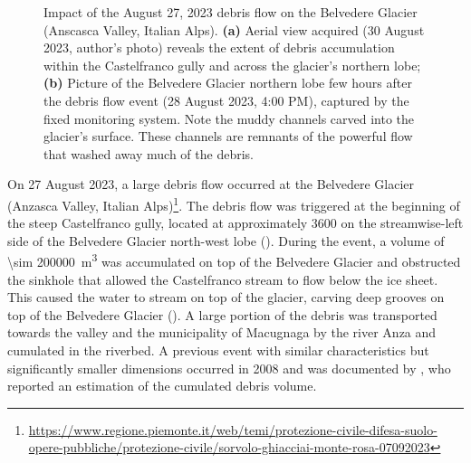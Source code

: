 \begin{figure}[ht!]
    \centering
    \caption{Impact of the August 27, 2023 debris flow on the Belvedere Glacier (Anscasca Valley, Italian Alps). \textbf{(a)} Aerial view acquired (30 August 2023, author's photo) reveals the extent of debris accumulation within the Castelfranco gully and across the glacier's northern lobe; \textbf{(b)} Picture of the Belvedere Glacier northern lobe few hours after the debris flow event (28 August 2023, 4:00 PM), captured by the fixed monitoring system. Note the 
    muddy channels carved into the glacier's surface. These channels are remnants of the powerful flow that washed away much of the debris.
    }
    \label{fig:1:belvedere_debris_flow}
\end{figure}

On 27 August 2023, a large debris flow occurred at the Belvedere Glacier (Anzasca Valley, Italian Alps)\footnote{\url{https://www.regione.piemonte.it/web/temi/protezione-civile-difesa-suolo-opere-pubbliche/protezione-civile/sorvolo-ghiacciai-monte-rosa-07092023}}.
The debris flow was triggered at the beginning of the steep Castelfranco gully, located at approximately \SI{3600}{\masl} on the streamwise-left side of the Belvedere Glacier north-west lobe ().
During the event, a volume of \SI{\sim 200000}{\cubic\meter} was accumulated on top of the Belvedere Glacier and obstructed the sinkhole that allowed the Castelfranco stream to flow below the ice sheet. 
This caused the water to stream on top of the glacier, carving deep grooves on top of the Belvedere Glacier (). 
A large portion of the debris was transported towards the valley and the municipality of Macugnaga by the river Anza and cumulated in the riverbed.
A previous event with similar characteristics but significantly smaller dimensions occurred in 2008 and was documented by \cite{Mortara2009}, who reported an estimation of the cumulated debris volume.

